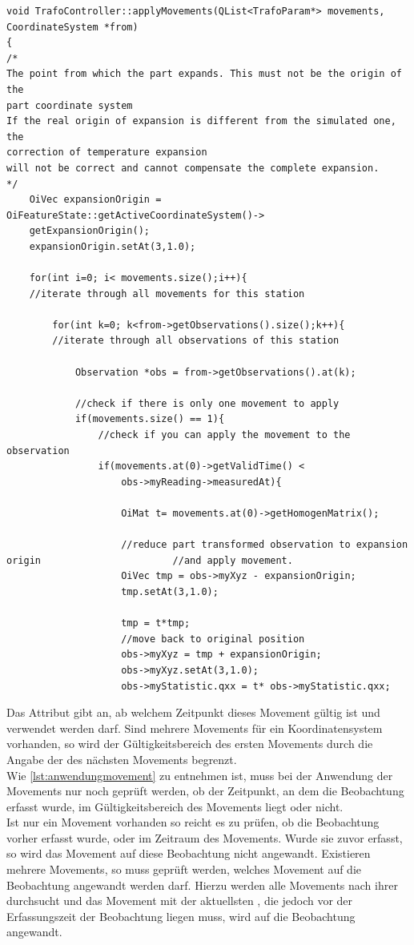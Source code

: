 \begin{lstlisting}[caption={Anwndung von Movements},captionpos=t,label=lst:anwendungmovement]
void TrafoController::applyMovements(QList<TrafoParam*> movements, CoordinateSystem *from)
{
/*
The point from which the part expands. This must not be the origin of the 
part coordinate system
If the real origin of expansion is different from the simulated one, the
correction of temperature expansion
will not be correct and cannot compensate the complete expansion.
*/
    OiVec expansionOrigin = OiFeatureState::getActiveCoordinateSystem()->
    getExpansionOrigin();
    expansionOrigin.setAt(3,1.0);

    for(int i=0; i< movements.size();i++){ 
    //iterate through all movements for this station

        for(int k=0; k<from->getObservations().size();k++){ 
        //iterate through all observations of this station

            Observation *obs = from->getObservations().at(k);

            //check if there is only one movement to apply
            if(movements.size() == 1){
                //check if you can apply the movement to the observation
                if(movements.at(0)->getValidTime() < 
                	obs->myReading->measuredAt){

                    OiMat t= movements.at(0)->getHomogenMatrix();

                    //reduce part transformed observation to expansion origin 						//and apply movement.
                    OiVec tmp = obs->myXyz - expansionOrigin;
                    tmp.setAt(3,1.0);

                    tmp = t*tmp;
                    //move back to original position
                    obs->myXyz = tmp + expansionOrigin;
                    obs->myXyz.setAt(3,1.0);
                    obs->myStatistic.qxx = t* obs->myStatistic.qxx;
\end{lstlisting}

Das Attribut  gibt an, ab welchem Zeitpunkt dieses Movement gültig ist und verwendet werden darf. Sind mehrere Movements für ein Koordinatensystem vorhanden, so wird der Gültigkeitsbereich des ersten Movements durch die Angabe der  des nächsten Movements begrenzt.\\
Wie \ref{lst:anwendungmovement} zu entnehmen ist, muss bei der Anwendung der Movements nur noch geprüft werden, ob der Zeitpunkt, an dem die Beobachtung erfasst wurde, im Gültigkeitsbereich des Movements liegt oder nicht.\\
Ist nur ein Movement vorhanden so reicht es zu prüfen, ob die Beobachtung vorher erfasst wurde, oder im Zeitraum des Movements. Wurde sie zuvor erfasst, so wird das Movement auf diese Beobachtung nicht angewandt.
Existieren mehrere Movements, so muss geprüft werden, welches Movement auf die Beobachtung angewandt werden darf. Hierzu werden alle Movements nach ihrer  durchsucht und das Movement mit der aktuellsten , die jedoch vor der Erfassungszeit der Beobachtung liegen muss, wird auf die Beobachtung angewandt.

